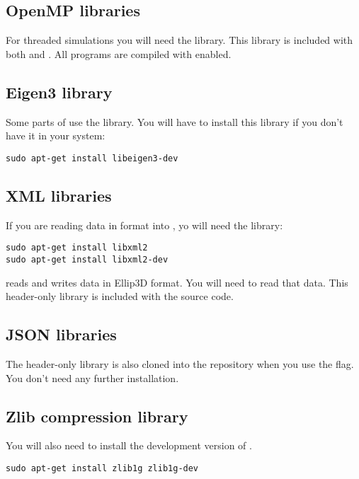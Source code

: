 \documentclass[11pt,fleqn]{book} %
\begin{document}
\subsection{OpenMP libraries}
For threaded simulations you will need the  library.  This library is included with
both  and .  All \GranularSim programs are compiled with  enabled.

\subsection{Eigen3 library}
Some parts of \GranularSim use the  library. You will have to install 
this library if you don't have it in your system:
\begin{lstlisting}[backgroundcolor=\color{background}]
sudo apt-get install libeigen3-dev
\end{lstlisting}

\subsection{XML libraries}
If you are reading data in \Vaango format into \GranularSim, yo will need the 
 library:
\begin{lstlisting}[backgroundcolor=\color{background}]
sudo apt-get install libxml2
sudo apt-get install libxml2-dev
\end{lstlisting}

\GranularSim reads and writes data in Ellip3D format.  You will need  to
read that data.  This header-only library is included with the source code.

\subsection{JSON libraries}
The  header-only library is also cloned into the repository when you use
the  flag.  You don't need any further installation.

\subsection{Zlib compression library}
You will also need to install the development version of .
\begin{lstlisting}[backgroundcolor=\color{background}]
sudo apt-get install zlib1g zlib1g-dev
\end{lstlisting}
\end{document}
